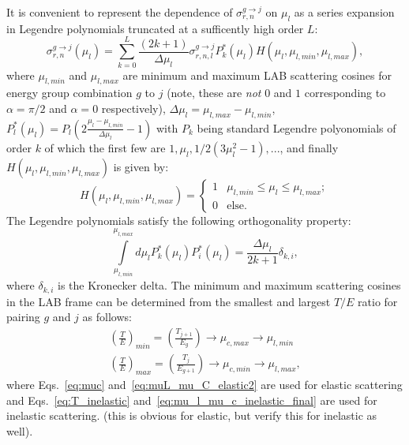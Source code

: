 \documentclass[review]{elsarticle}
\begin{document}
It is convenient to represent the dependence of  $\sigma_{r,n}^{g \rightarrow j}$ on $\mu_l$ as a series expansion in Legendre polynomials truncated at a sufficently high order $L$:
\begin{equation}\label{eq:leg_expansion_sigma}
   \sigma_{r,n}^{g \rightarrow j} (\mu_l) = \sum\limits_{k=0}^{L} \frac{(2k +1)}{\Delta \mu_l} \sigma_{r,n,l}^{g \rightarrow j} P_k^*(\mu_l) H(\mu_l, \mu_{l,min}, \mu_{l,max}),
\end{equation}
where $\mu_{l,min}$ and $\mu_{l,max}$ are minimum and maximum LAB scattering cosines for energy group combination $g$ to $j$ (note, these are \textit{not} $0$ and $1$ corresponding to $\alpha=\pi/2$ and $\alpha=0$ respectively), $\Delta \mu_l = \mu_{l,max} - \mu_{l,min}$, $P_l^*(\mu_l)=P_l \left(  2 \frac{\mu_l - \mu_{l,min}}{\Delta \mu_l} - 1  \right)$ with $P_k$ being standard Legendre polyonomials of order $k$ of which the first few are $1, \mu_l, 1/2(3 \mu_l^2 - 1), ...$, and finally $H(\mu_l, \mu_{l,min}, \mu_{l,max})$ is given by:
\begin{equation}
  H(\mu_l, \mu_{l,min}, \mu_{l,max}) = \left\{ \begin{array}{ll}
         1 & \mu_{l,min} \le  \mu_l \le  \mu_{l,max};\\
         0 & \text{else}.\end{array} \right.
\end{equation}
The Legendre polynomials satisfy the following orthogonality property:
\begin{equation}
	\int\limits_{\mu_{l,min}}^{\mu_{l,max}} d \mu_l P^*_k(\mu_l) P^*_{i}(\mu_l) = \frac{\Delta \mu_l}{2k +1} \delta_{k,i},
\end{equation}
where $\delta_{k,i}$ is the Kronecker delta.
The minimum and maximum scattering cosines in the LAB frame can be determined from the smallest and largest $T / E$ ratio for pairing $g$ and $j$ as follows:
\begin{align}\label{eq:min_max_mu}
   \left( \frac{T}{E} \right)_{min} = \left( \frac{T_{j+1}}{E_{g}}   \right) \rightarrow \mu_{c,max} \rightarrow \mu_{l,min} \nonumber \\
    \left( \frac{T}{E} \right)_{max} = \left( \frac{T_{j}}{E_{g+1}}   \right) \rightarrow \mu_{c,min} \rightarrow \mu_{l,max},
\end{align}
where Eqs.~\ref{eq:muc} and~\ref{eq:muL_mu_C_elastic2} are used for elastic scattering and Eqs.~\ref{eq:T_inelastic} and~\ref{eq:mu_l_mu_c_inelastic_final} are used for inelastic scattering.
(this is obvious for elastic, but verify this for inelastic as well).
\end{document}
